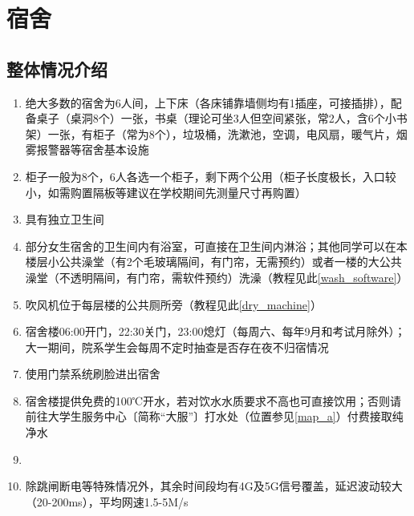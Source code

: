 \chapter[宿舍]{宿舍}
\section[整体情况介绍]{整体情况介绍}
\begin{enumerate}
    \item 绝大多数的宿舍为6人间，上下床（各床铺靠墙侧均有1插座，可接插排），配备桌子（桌洞8个）一张，书桌（理论可坐3人但空间紧张，常2人，含6个小书架）一张，有柜子（常为8个），垃圾桶，洗漱池，空调，电风扇，暖气片，烟雾报警器等宿舍基本设施
    \item 柜子一般为8个，6人各选一个柜子，剩下两个公用（柜子长度极长，入口较小，如需购置隔板等建议在学校期间先测量尺寸再购置）
    \item 具有独立卫生间
    \item 部分女生宿舍的卫生间内有浴室，可直接在卫生间内淋浴；其他同学可以在本楼层小公共澡堂（有2个毛玻璃隔间，有门帘，无需预约）或者一楼的大公共澡堂（不透明隔间，有门帘，需软件预约）洗澡（教程见此\uline{\ref{wash_software}}）
    \item 吹风机位于每层楼的公共厕所旁（教程见此\uline{\ref{dry_machine}}）
    \item 宿舍楼06:00开门，22:30关门，23:00熄灯（每周六、每年9月和考试月除外）；大一期间，院系学生会每周不定时抽查是否存在夜不归宿情况
    \item 使用门禁系统刷脸进出宿舍
    \item 宿舍楼提供免费的100℃开水\footnotemark，若对饮水水质要求不高也可直接饮用；否则请前往大学生服务中心〔简称“大服”〕打水处（位置参见\uline{\ref{map_a}}）付费接取纯净水
    \item \textbf{}
    \item 除跳闸断电等特殊情况外，其余时间段均有4G及5G信号覆盖，延迟波动较大（20-200ms），平均网速1.5-5M/s
\end{enumerate}


